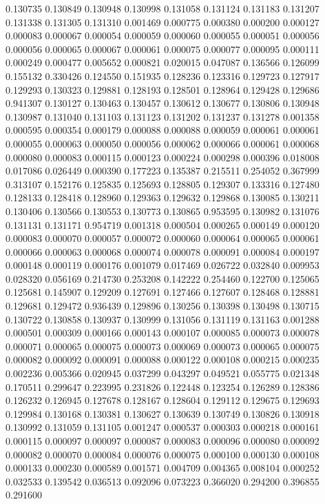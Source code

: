 0.130735
0.130849
0.130948
0.130998
0.131058
0.131124
0.131183
0.131207
0.131338
0.131305
0.131310
0.001469
0.000775
0.000380
0.000200
0.000127
0.000083
0.000067
0.000054
0.000059
0.000060
0.000055
0.000051
0.000056
0.000056
0.000065
0.000067
0.000061
0.000075
0.000077
0.000095
0.000111
0.000249
0.000477
0.005652
0.000821
0.020015
0.047087
0.136566
0.126099
0.155132
0.330426
0.124550
0.151935
0.128236
0.123316
0.129723
0.127917
0.129293
0.130323
0.129881
0.128193
0.128501
0.128964
0.129428
0.129686
0.941307
0.130127
0.130463
0.130457
0.130612
0.130677
0.130806
0.130948
0.130987
0.131040
0.131103
0.131123
0.131202
0.131237
0.131278
0.001358
0.000595
0.000354
0.000179
0.000088
0.000088
0.000059
0.000061
0.000061
0.000055
0.000063
0.000050
0.000056
0.000062
0.000066
0.000061
0.000068
0.000080
0.000083
0.000115
0.000123
0.000224
0.000298
0.000396
0.018008
0.017086
0.026449
0.000390
0.177223
0.135387
0.215511
0.254052
0.367999
0.313107
0.152176
0.125835
0.125693
0.128805
0.129307
0.133316
0.127480
0.128133
0.128418
0.128960
0.129363
0.129632
0.129868
0.130085
0.130211
0.130406
0.130566
0.130553
0.130773
0.130865
0.953595
0.130982
0.131076
0.131131
0.131171
0.954719
0.001318
0.000504
0.000265
0.000149
0.000120
0.000083
0.000070
0.000057
0.000072
0.000060
0.000064
0.000065
0.000061
0.000066
0.000063
0.000068
0.000074
0.000078
0.000091
0.000084
0.000197
0.000148
0.000119
0.000176
0.001079
0.017469
0.026722
0.032840
0.009953
0.028320
0.056169
0.214730
0.253208
0.142222
0.254460
0.122700
0.125065
0.125681
0.145907
0.129209
0.127691
0.127466
0.127607
0.128468
0.128881
0.129681
0.129472
0.936439
0.129896
0.130256
0.130398
0.130498
0.130715
0.130722
0.130858
0.130937
0.130999
0.131056
0.131119
0.131163
0.001288
0.000501
0.000309
0.000166
0.000143
0.000107
0.000085
0.000073
0.000078
0.000071
0.000065
0.000075
0.000073
0.000069
0.000073
0.000065
0.000075
0.000082
0.000092
0.000091
0.000088
0.000122
0.000108
0.000215
0.000235
0.002236
0.005366
0.020945
0.037299
0.043297
0.049521
0.055775
0.021348
0.170511
0.299647
0.223995
0.231826
0.122448
0.123254
0.126289
0.128386
0.126232
0.126945
0.127678
0.128167
0.128604
0.129112
0.129675
0.129693
0.129984
0.130168
0.130381
0.130627
0.130639
0.130749
0.130826
0.130918
0.130992
0.131059
0.131105
0.001247
0.000537
0.000303
0.000218
0.000161
0.000115
0.000097
0.000097
0.000087
0.000083
0.000096
0.000080
0.000092
0.000082
0.000070
0.000084
0.000076
0.000075
0.000100
0.000130
0.000108
0.000133
0.000230
0.000589
0.001571
0.004709
0.004365
0.008104
0.000252
0.032533
0.139542
0.036513
0.092096
0.073223
0.366020
0.294200
0.396855
0.291600
